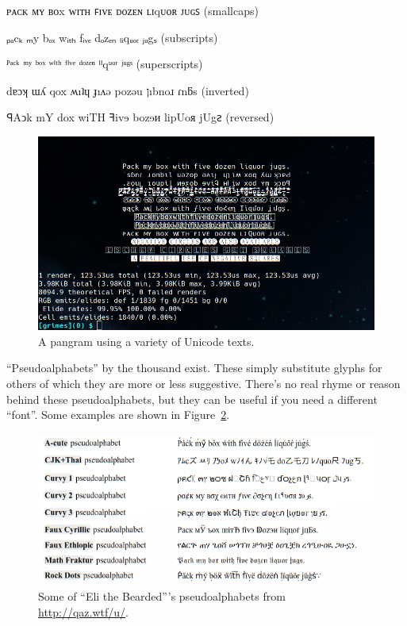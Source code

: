 \begin{denseitemize}
\item{{ᴘᴀᴄᴋ ᴍʏ ʙᴏx ᴡɪᴛʜ ꜰɪᴠᴇ ᴅᴏᴢᴇɴ ʟɪqᴜᴏʀ ᴊᴜɢꜱ (smallcaps)}}
\item{{ₚₐcₖ ₘy bₒₓ wᵢₜₕ fᵢᵥₑ dₒzₑₙ ₗᵢqᵤₒᵣ ⱼᵤgₛ (subscripts)}}
\item{{ᴾᵃᶜᵏ ᵐʸ ᵇᵒˣ ʷⁱᵗʰ ᶠⁱᵛᵉ ᵈᵒᶻᵉⁿ ˡⁱqᵘᵒʳ ʲᵘᵍˢ (superscripts)}}
\item{{dɐɔʞ ɯʎ qox ʍıʇɥ ɟıʌǝ pozǝu ןıbnoɹ ɾnƃs (inverted)}}
\item{{ꟼAↄk mY dox wiTH ꟻivɘ bozɘᴎ lipUoᴙ jUgꙅ (reversed)}}
\end{denseitemize}

\begin{figure}[!htb]
    \centering
    \includegraphics[width=.75\linewidth]{media/unicode-weird.png}
    \caption{A pangram using a variety of Unicode texts.}
    \label{fig:unicodeweird}
\end{figure}

``Pseudoalphabets'' by the thousand exist. These simply substitute glyphs for
others of which they are more or less suggestive. There's no real rhyme or
reason behind these pseudoalphabets, but they can be useful if you need a
different ``font''. Some examples are shown in Figure~\ref{fig:pseudoalphabets}.

\begin{figure}[!htb]
    \centering
    \includegraphics[width=.75\linewidth]{media/pseudoalphabets.png}
    \caption{Some of ``Eli the Bearded'''s pseudoalphabets from \url{http://qaz.wtf/u/}.}
    \label{fig:pseudoalphabets}
\end{figure}

